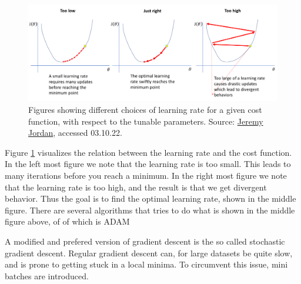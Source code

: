\begin{figure}[H]
    \includegraphics[width=\linewidth]{Figures/Machinelearning/lr_choice.png}
    \caption[Explaining concequence of choice of learning rate]{Figures showing different choices of learning rate for a given cost function, with respect to the tunable parameters. 
    Source: \href{https://www.jeremyjordan.me/content/images/2018/02/Screen-Shot-2018-02-24-at-11.47.09-AM.png}{Jeremy Jordan}, accessed 03.10.22.}
    \label{fig:lr_choice}
\end{figure}

Figure \ref{fig:lr_choice} visualizes the relation between the learning rate and the cost function. 
In the left most figure we note that the learning rate is too small. This leads to many iterations 
before you reach a minimum. In the right most figure we note that the learning rate is too high, 
and the result is that we get divergent behavior. Thus the goal is to find the optimal learning 
rate, shown in the middle figure. There are several algorithms that tries to do what is shown in 
the middle figure above, of of which is ADAM\cite{ADAM:opti}\par 
A modified and prefered version of gradient descent is the so called stochastic gradient descent.
Regular gradient descent can, for large datasets be quite slow, and is prone to getting stuck 
in a local minima. To circumvent this issue, mini batches are introduced. 




